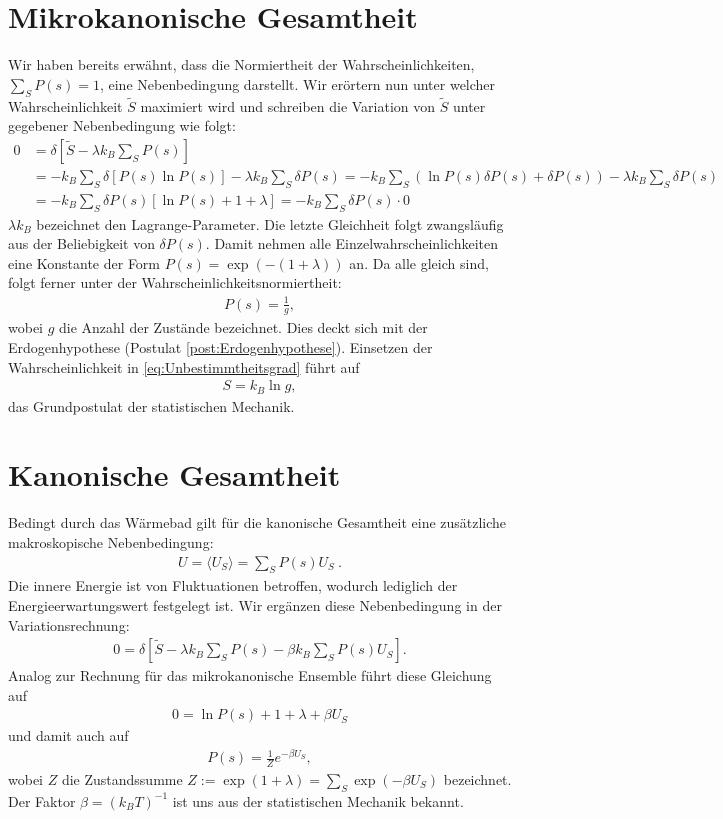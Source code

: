 \section{Mikrokanonische Gesamtheit}
Wir haben bereits erwähnt, dass die Normiertheit der Wahrscheinlichkeiten, $\sum_S P(s)=1$, eine Nebenbedingung darstellt.
Wir erörtern nun unter welcher Wahrscheinlichkeit $\widetilde{S}$ maximiert wird und schreiben die Variation von $\widetilde{S}$ unter gegebener Nebenbedingung wie folgt:
\begin{align*}
    0&=\delta [\widetilde{S}-\lambda k_B \sum_S P(s)]\\
    &=-k_B\sum_S \delta[P(s)\ln P(s)]-\lambda k_B \sum_S \delta P(s)=-k_B\sum_S (\ln P(s)\delta P(s)+\delta P(s))-\lambda k_B \sum_S \delta P(s)\\
    &=-k_B\sum_S \delta P(s)[\ln P(s)+1+\lambda]=-k_B\sum_S \delta P(s)\cdot 0
\end{align*}
$\lambda k_B$ bezeichnet den Lagrange-Parameter. Die letzte Gleichheit folgt zwangsläufig aus der Beliebigkeit von $\delta P(s)$. Damit nehmen alle Einzelwahrscheinlichkeiten eine Konstante der Form $P(s)=\exp(-(1+\lambda))$ an. Da alle gleich sind, folgt ferner unter der Wahrscheinlichkeitsnormiertheit:
\begin{align*}
    P(s)=\frac{1}{g},
\end{align*}
wobei $g$ die Anzahl der Zustände bezeichnet. Dies deckt sich mit der Erdogenhypothese (Postulat \ref{post:Erdogenhypothese}). 
Einsetzen der Wahrscheinlichkeit in \ref{eq:Unbestimmtheitsgrad} führt auf 
\begin{align*}
    S=k_B \ln g,
\end{align*}
das Grundpostulat der statistischen Mechanik.

\section{Kanonische Gesamtheit}
Bedingt durch das Wärmebad gilt für die kanonische Gesamtheit eine zusätzliche makroskopische Nebenbedingung:
\begin{align*}
    \boxed{U=\langle U_S \rangle=\sum_S P(s)U_S}\:.
\end{align*}
Die innere Energie ist von Fluktuationen betroffen, wodurch lediglich der Energieerwartungswert festgelegt ist. 
Wir ergänzen diese Nebenbedingung in der Variationsrechnung:
\begin{align*}
    0=\delta [\widetilde{S}-\lambda k_B \sum_S P(s)-\beta k_B \sum_S P(s)U_S].
\end{align*}
Analog zur Rechnung für das mikrokanonische Ensemble führt diese Gleichung auf
\begin{align*}
    0=\ln P(s) +1+\lambda+\beta U_S
\end{align*}
und damit auch auf
\begin{align*}
    P(s)=\frac{1}{Z}e^{-\beta U_S},
\end{align*}
wobei $Z$ die Zustandssumme $Z:=\exp(1+\lambda)=\sum_S\exp(-\beta U_S)$ bezeichnet. Der Faktor $\beta=(k_B T)^{-1}$ ist uns aus der statistischen Mechanik bekannt.

